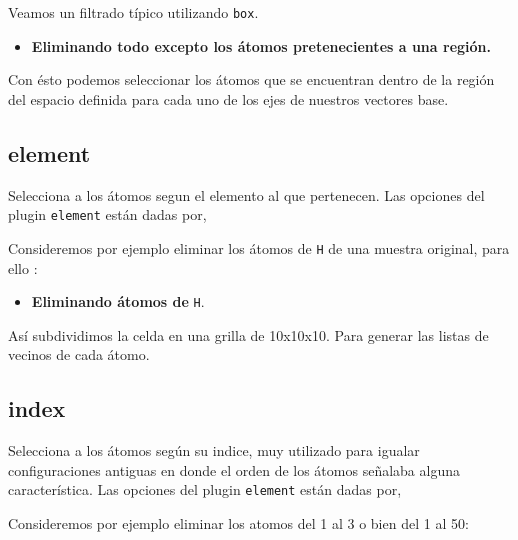 Veamos un filtrado t\'ipico utilizando \verb|box|.

\begin{itemize}
 \item \textbf{Eliminando todo excepto los \'atomos pretenecientes a una regi\'on.}
\end{itemize}

Con \'esto podemos seleccionar los \'atomos que se encuentran dentro de la regi\'on del espacio definida para cada uno de los ejes de nuestros vectores base.

\subsection{element}
Selecciona a los \'atomos segun el elemento al que pertenecen. Las opciones del plugin \verb|element| est\'an dadas por,


Consideremos por ejemplo eliminar los \'atomos de \verb|H| de una muestra original, para ello :

\begin{itemize}
 \item \textbf{Eliminando \'atomos de} \texttt{H}.
\end{itemize}

As\'i subdividimos la celda en una grilla de 10x10x10. Para generar las listas de vecinos de cada \'atomo.

\subsection{index}
Selecciona a los \'atomos seg\'un su indice, muy utilizado para igualar configuraciones antiguas en donde el orden de los \'atomos señalaba alguna caracter\'istica. Las opciones del plugin \verb|element| est\'an dadas por,


Consideremos por ejemplo eliminar los atomos del 1 al 3 o bien del 1 al 50:

